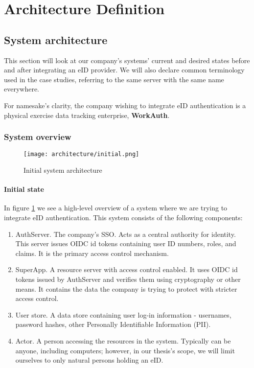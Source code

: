 \section{Architecture Definition}

\subsection{System architecture}

This section will look at our company's systems' current and desired states before and after integrating an eID provider. We will also declare common terminology used in the case studies, referring to the same server with the same name everywhere.

For namesake's clarity, the company wishing to integrate eID authentication is a physical exercise data tracking enterprise, \textbf{WorkAuth}.

\subsubsection{System overview}

\begin{figure}
  \centering
  \texttt{[image: architecture/initial.png]}
  \caption{Initial system architecture}
  \label{fig:sys-highlevel}
\end{figure}


\paragraph{Initial state}

In figure \ref{fig:sys-highlevel} we see a high-level overview of a system where we are trying to integrate eID authentication. This system consists of the following components:

\begin{enumerate}
  \item AuthServer. The company's SSO. Acts as a central authority for identity. This server issues OIDC id tokens containing user ID numbers, roles, and claims. It is the primary access control mechanism.
  \item SuperApp. A resource server with access control enabled. It uses OIDC id tokens issued by AuthServer and verifies them using cryptography or other means. It contains the data the company is trying to protect with stricter access control.
  \item User store. A data store containing user log-in information - usernames, password hashes, other Personally Identifiable Information (PII).
  \item Actor. A person accessing the resources in the system. Typically can be anyone, including computers; however, in our thesis's scope, we will limit ourselves to only natural persons holding an eID.
\end{enumerate}

